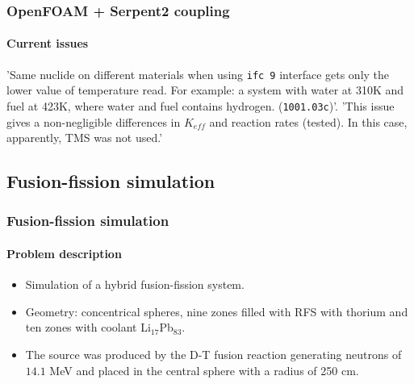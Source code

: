 \documentclass[svgnames,smaller,table]{beamer}
\begin{document}
\begin{frame}[fragile] %
  \frametitle{OpenFOAM + Serpent2 coupling}
  \framesubtitle{Current issues}  
  'Same nuclide on different materials when using \texttt{ifc 9} interface gets only the lower value
  of temperature read. For example: a system with water at 310K and fuel at 423K, where water and fuel
  contains hydrogen. (\texttt{1001.03c})'.
  \vspace{10px}
  'This issue gives a non-negligible differences in $K_{eff}$ and reaction rates (tested). In this case,
  apparently, TMS was not used.'
\end{frame}



\subsection{Fusion-fission simulation}

\begin{frame}
  \frametitle{Fusion-fission simulation}
  \framesubtitle{Problem description}
  \begin{itemize}
  \item Simulation of a hybrid fusion-fission system.
  \item Geometry: concentrical spheres, nine zones filled with RFS with thorium and ten zones with coolant Li$_{17}$Pb$_{83}$.
  \item The source was produced by the D-T fusion reaction generating neutrons of $14.1$ MeV and placed in the central sphere with a radius of 250 cm.
  \end{itemize}
\end{frame}
\end{document}
